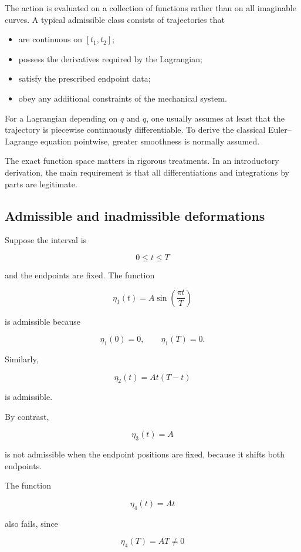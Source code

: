 The action is evaluated on a collection of functions rather than on all imaginable curves. A typical admissible class consists of trajectories that

\begin{itemize}
    \item are continuous on \([t_{1},t_{2}]\);
    \item possess the derivatives required by the Lagrangian;
    \item satisfy the prescribed endpoint data;
    \item obey any additional constraints of the mechanical system.
\end{itemize}

For a Lagrangian depending on \(q\) and \(\dot q\), one usually assumes at least that the trajectory is piecewise continuously differentiable. To derive the classical Euler--Lagrange equation pointwise, greater smoothness is normally assumed.

The exact function space matters in rigorous treatments. In an introductory derivation, the main requirement is that all differentiations and integrations by parts are legitimate.

\subsection{Admissible and inadmissible deformations}

Suppose the interval is

\[
0\leq t\leq T
\]

and the endpoints are fixed. The function

\[
\eta_{1}(t)
=
A\sin\left(\frac{\pi t}{T}\right)
\]

is admissible because

\[
\eta_{1}(0)=0,
\qquad
\eta_{1}(T)=0.
\]

Similarly,

\[
\eta_{2}(t)
=
A t(T-t)
\]

is admissible.

By contrast,

\[
\eta_{3}(t)=A
\]

is not admissible when the endpoint positions are fixed, because it shifts both endpoints.

The function

\[
\eta_{4}(t)=At
\]

also fails, since

\[
\eta_{4}(T)=AT\neq 0
\]

